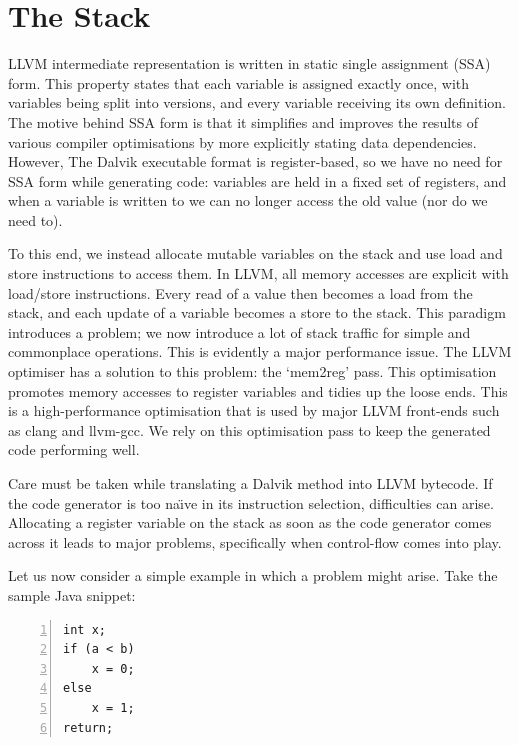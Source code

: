\section{The Stack}
\label{sec:stack}

LLVM intermediate representation is written in static single assignment (SSA) form. This property states that each variable is assigned exactly once, with variables being split into versions, and every variable receiving its own definition. The motive behind SSA form is that it simplifies and improves the results of various compiler optimisations by more explicitly stating data dependencies. However, The Dalvik executable format is register-based, so we have no need for SSA form while generating code: variables are held in a fixed set of registers, and when a variable is written to we can no longer access the old value (nor do we need to).

To this end, we instead allocate mutable variables on the stack and use load and store instructions to access them. In LLVM, all memory accesses are explicit with load/store instructions. Every read of a value then becomes a load from the stack, and each update of a variable becomes a store to the stack. This paradigm introduces a problem; we now introduce a lot of stack traffic for simple and commonplace operations. This is evidently a major performance issue. The LLVM optimiser has a solution to this problem: the `mem2reg' pass. This optimisation promotes memory accesses to register variables and tidies up the loose ends. This is a high-performance optimisation that is used by major LLVM front-ends such as clang and llvm-gcc\footnotemark {}. We rely on this optimisation pass to keep the generated code performing well.

Care must be taken while translating a Dalvik method into LLVM bytecode. If the code generator is too na\"{\i}ve in its instruction selection, difficulties can arise. Allocating a register variable on the stack as soon as the code generator comes across it leads to major problems, specifically when control-flow comes into play.

Let us now consider a simple example in which a problem might arise. Take the sample Java snippet:

\lstset{
	language=Java,
	basicstyle=\small,
	stringstyle=\ttfamily
}

\begin{lstlisting}[frame=single, numbers=left, numberstyle=\tiny, caption={Java control-flow example}, label=lst:java_br]
int x;
if (a < b)
    x = 0;
else
    x = 1;
return;
\end{lstlisting}

